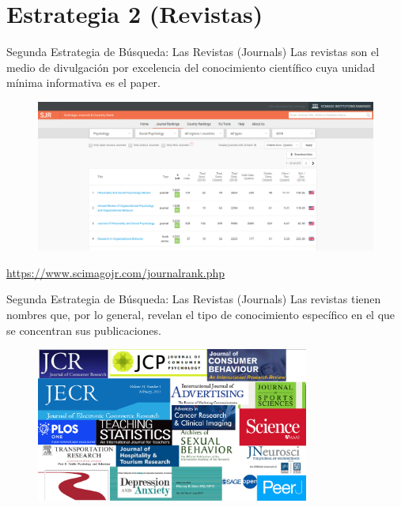 \documentclass[9pt]{beamer}
\begin{document}
\section{Estrategia 2 (Revistas)}
\begin{frame}{Segunda Estrategia de Búsqueda: Las Revistas (Journals)}
Las revistas son el medio de divulgación por excelencia del conocimiento científico cuya unidad mínima informativa es el paper.
\begin{figure}
\centering
 \includegraphics[width=1\textwidth]{b7}
\end{figure}
\color{blue!46!green}
\url{https://www.scimagojr.com/journalrank.php}
\end{frame}

\begin{frame}{Segunda Estrategia de Búsqueda: Las Revistas (Journals)}
Las revistas tienen nombres que, por lo general, revelan el tipo de conocimiento específico en el que se concentran sus publicaciones.
\begin{figure}
\centering
 \includegraphics[width=0.8\textwidth]{b8}
\end{figure}
\end{frame}
\end{document}
